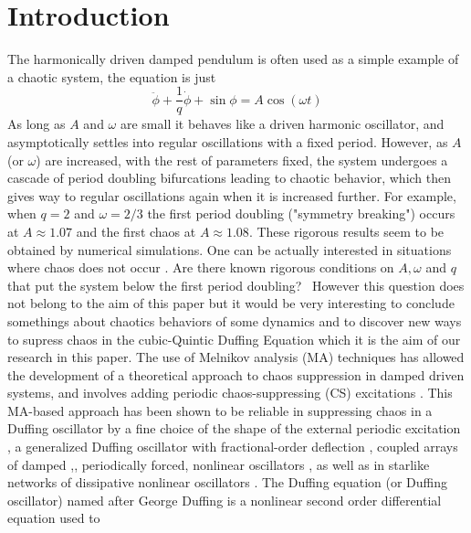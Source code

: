 \documentclass{ws-ijbc}
\begin{document}

\section{Introduction}
\noindent The harmonically driven damped pendulum is often used as a simple example of
a chaotic system, the equation is just 
\begin{equation}
\ddot{\phi}+\frac{1}{q}\dot{\phi}+\sin \phi =A\cos (\omega t)  \label{c_1}
\end{equation}%
As long as $A$ and $\omega $ are small it behaves like a driven harmonic
oscillator, and asymptotically settles into regular oscillations with a
fixed period. However, as $A$ (or $\omega $) are increased, with the rest of
parameters fixed, the system undergoes a cascade of period doubling
bifurcations leading to chaotic behavior, which then gives way to regular
oscillations again when it is increased further. For example, when $q=2$ and 
$\omega =2/3$ the first period doubling ("symmetry breaking") occurs at $%
A\approx 1.07$ and the first chaos at $A\approx 1.08$. These rigorous
results seem to be obtained by numerical simulations. One can be actually
interested in situations where chaos does not occur \cite{H82}. Are there known
rigorous conditions on $A,\omega $ and $q$ that put the system below the
first period doubling? \ However this question does not belong to the aim of
this paper but it would be very interesting to conclude somethings about
chaotics behaviors of some dynamics and to discover new ways to supress
chaos in the cubic-Quintic Duffing Equation which it is the aim of our
research in this paper. \noindent The use of Melnikov analysis (MA)
techniques \cite{Milinkov63} has allowed the development of a theoretical approach to
chaos suppression in damped driven systems, and  involves adding periodic
chaos-suppressing (CS) excitations \cite{P22}. This MA-based approach has
been shown to be reliable in suppressing chaos in a Duffing oscillator by a
fine choice of the shape of the external periodic excitation \cite{Milinkov63}, a
generalized Duffing oscillator with fractional-order deflection \cite{Gilbert82},
coupled arrays of damped \cite{Alvaro2022},\cite{AlvaroS2022}, periodically forced, nonlinear oscillators 
, as well as in starlike networks of dissipative nonlinear oscillators 
\cite{CV93}. \noindent The Duffing equation (or Duffing oscillator) named after
George Duffing is a nonlinear second order differential equation used to
\end{document}
